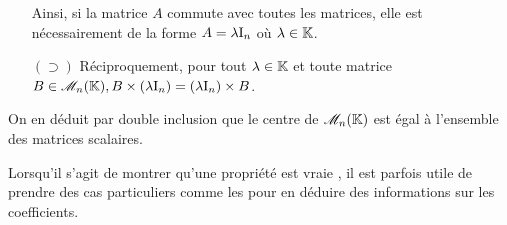 \begin{preuve}
\begin{itemize}
        Ainsi, si la matrice $A$ commute avec toutes les matrices, elle est nécessairement de la forme $A = \lambda \mathrm{I}_n$ où $\lambda \in \mathbb{K}$.
        \item[$(\supset)$] Réciproquement, pour tout $\lambda \in \mathbb{K}$ et toute matrice $B \in \mathscr{M}_n(\mathbb{K}), B \times (\lambda \mathrm{I}_n) = (\lambda \mathrm{I}_n) \times B$. 
    \end{itemize}
    On en déduit par double inclusion que le centre de $\mathscr{M}_n(\mathbb{K})$ est égal à l'ensemble des matrices scalaires. 
\end{preuve}

\begin{methode}
    Lorsqu'il s'agit de montrer qu'une propriété est vraie , il est parfois utile de prendre des cas particuliers comme les  pour en déduire des informations sur les coefficients.
\end{methode}

